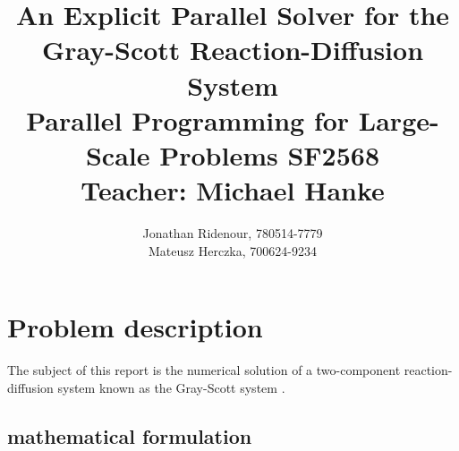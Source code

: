 \documentclass[a4paper,11pt]{article}
\title{ An Explicit Parallel Solver for the Gray-Scott Reaction-Diffusion System\\ 
\vspace{1.2cm}
\large Parallel Programming for Large-Scale Problems SF2568 \\ 
Teacher: Michael Hanke}
\author{Jonathan Ridenour, 780514-7779\\
Mateusz Herczka, 700624-9234}
\begin{document}
%
\maketitle
\pagebreak
\section*{Problem description}
The subject of this report is the numerical solution of a two-component reaction-diffusion system known as the Gray-Scott system \cite{Wang}. 
\subsection*{mathematical formulation}
\end{document}
